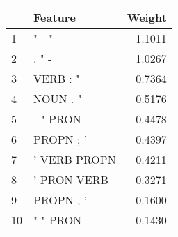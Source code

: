 \begin{tabular}{llr}
\toprule
{} &       Feature &  Weight \\
\midrule
1  &         " - " &  1.1011 \\
2  &         . " - &  1.0267 \\
3  &      VERB : " &  0.7364 \\
4  &      NOUN . " &  0.5176 \\
5  &      - " PRON &  0.4478 \\
6  &     PROPN ; ' &  0.4397 \\
7  &  ' VERB PROPN &  0.4211 \\
8  &   ' PRON VERB &  0.3271 \\
9  &     PROPN , ' &  0.1600 \\
10 &      " " PRON &  0.1430 \\
\bottomrule
\end{tabular}
